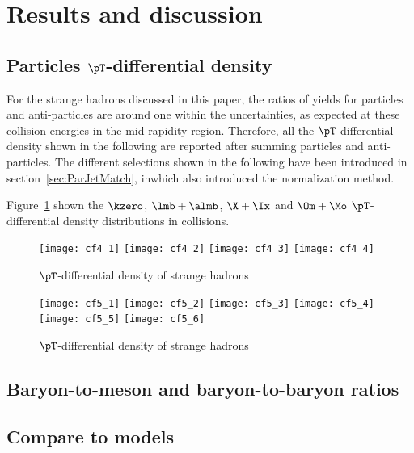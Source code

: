 
\section{Results and discussion}%
\label{sec:Results}

\subsection{Particles $\pT$-differential density}
\label{subsec:ParPtDensity}

For the strange hadrons discussed in this paper, the ratios of yields for particles and anti-particles are around one within the uncertainties, as expected at these collision energies in the mid-rapidity region.
Therefore, all the $\pT$-differential density shown in the following are reported after summing particles and anti-particles.
The different selections shown in the following have been introduced in section~\ref{sec:ParJetMatch}, inwhich also introduced the normalization method. 

Figure~\ref{fig:ppSpect} shown the $\kzero$, $\lmb + \almb$, $\X + \Ix$ and $\Om + \Mo$ $\pT$-differential density distributions in \pp collisions.


\begin{figure}[!ht]
	\begin{center}
		\texttt{[image: cf4\_1]}
		\texttt{[image: cf4\_2]}
		\texttt{[image: cf4\_3]}
		\texttt{[image: cf4\_4]}
	\end{center}
	\caption{$\pT$-differential density of strange hadrons }
	\label{fig:ppSpect}
\end{figure}
\begin{figure}[!ht]
	\begin{center}
		\texttt{[image: cf5\_1]}
		\texttt{[image: cf5\_2]}
		\texttt{[image: cf5\_3]}
		\texttt{[image: cf5\_4]}
		\texttt{[image: cf5\_5]}
		\texttt{[image: cf5\_6]}
	\end{center}
	\caption{$\pT$-differential density of strange hadrons }
	\label{fig:pPbSpect}
\end{figure}
\subsection{Baryon-to-meson and baryon-to-baryon ratios}
\label{subsec:ParRatios}



\subsection{Compare to models}
\label{subsec:ComToMod}
